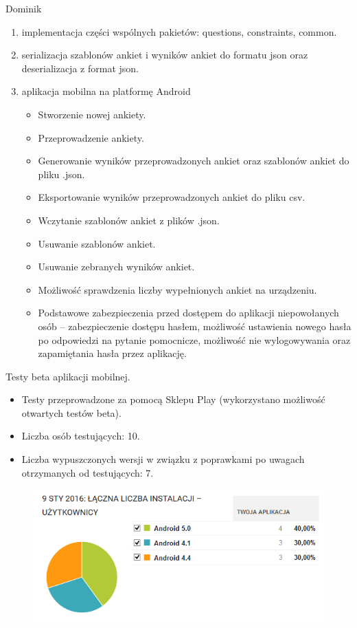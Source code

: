 \documentclass[a4paper,10pt]{beamer}
\begin{document}
	\begin{frame}{Dominik}
		\begin{enumerate}
			\item	implementacja części wspólnych pakietów: questions, constraints, common.
			\item	serializacja szablonów ankiet i wyników ankiet do formatu json oraz deserializacja z format json.
			\item	aplikacja mobilna na platformę Android	
			\begin{itemize}
				\item	Stworzenie nowej ankiety.
				\item	Przeprowadzenie ankiety.
				\item	Generowanie wyników przeprowadzonych ankiet oraz szablonów ankiet do pliku .json.
				\item	Eksportowanie wyników przeprowadzonych ankiet do pliku csv.
				\item	Wczytanie szablonów ankiet z plików .json.
				\item	Usuwanie szablonów ankiet.
				\item	Usuwanie zebranych wyników ankiet.
				\item	Możliwość sprawdzenia liczby wypełnionych ankiet na urządzeniu.
				\item	Podstawowe zabezpieczenia przed dostępem do aplikacji niepowołanych osób – zabezpieczenie dostępu hasłem, możliwość ustawienia nowego hasła po odpowiedzi na pytanie pomocnicze, możliwość nie wylogowywania oraz zapamiętania hasła przez aplikację.
			\end{itemize}
		\end{enumerate}
	\end{frame}
	
	\begin{frame}{Testy beta aplikacji mobilnej.}
			\begin{itemize}
				\item Testy przeprowadzone za pomocą Sklepu Play (wykorzystano możliwość otwartych testów beta).
				\item Liczba osób testujących: 10.
				\item Liczba wypuszczonych wersji w związku z poprawkami po uwagach otrzymanych od testujących: 7.
			\end{itemize}
			
			\begin{figure}[H]
				\includegraphics[scale=0.6]{prezentacja_obronaII_zdjecia/wersje_android.png}
			\end{figure}
	\end{frame}
	
\end{document}
